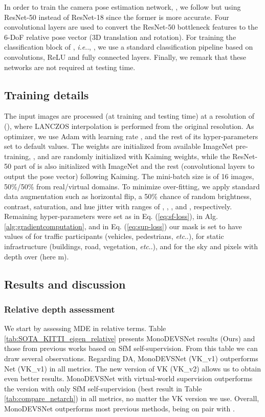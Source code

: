 \documentclass[journal]{IEEEtran}
\makeatletter
\DeclareRobustCommand\onedot{\futurelet\@let@token\@onedot}
\def\@onedot{\ifx\@let@token.\else.\null\fi\xspace}
\def\ie{\emph{i.e}\onedot} \def\Ie{\emph{I.e}\onedot}
\def\etc{\emph{etc}\onedot} \def\vs{\emph{vs}\onedot}
\newcommand{\Eq}[1]{Eq. (\ref{eq:#1})}
\newcommand{\Tab}[1]{Table \ref{tab:#1}}
\newcommand{\Alg}[1]{Alg. \ref{alg:#1}}
\makeatother
\begin{document}
In order to train the camera pose estimation network, , we follow \cite{Godard:2019MonoDepth2} but
using ResNet-50 instead of ResNet-18 since the former is more accurate. Four convolutional layers are used to convert the ResNet-50 bottleneck features to the 6-DoF relative pose vector (3D translation and rotation). For training the classification block of , {\ie}, , we use a standard classification pipeline based on convolutions, ReLU and fully connected layers. Finally, we remark that these networks are not required at testing time.

\subsection{Training details}
\label{ssec:training}

The input images are processed (at training and testing time) at a resolution of  ({}), where LANCZOS interpolation is performed from the  original resolution. As optimizer, we use Adam \cite{Kingma:2015} with learning rate , and the rest of its hyper-parameters set to default values. The weights  are initialized from available ImageNet \cite{Deng:2009} pre-training, , and  are randomly initialized with Kaiming weights, while the ResNet-50 part of  is also initialized with ImageNet and the rest (convolutional layers to output the pose vector) following Kaiming. The mini-batch size is of 16 images, 50\%/50\% from real/virtual domains. To minimize over-fitting, we apply standard data augmentation such as horizontal flip, a 50\% chance of random brightness, contrast, saturation, and hue jitter with ranges of , , , and , respectively. Remaining hyper-parameters were set as  in \Eq{sf-loss},  in \Alg{gradientcomputation}, and in \Eq{sup-loss} our mask  is set to have values of  for traffic participants (vehicles, pedestrians, {\etc}),  for static infrastructure (buildings, road, vegetation, {\etc}), and  for the sky and pixels with depth over  (here m).

\subsection{Results and discussion}
\label{ssec:results}

\subsubsection{Relative depth assessment}
We start by assessing MDE in relative terms. Table \ref{tab:SOTA_KITTI_eigen_relative} presents MonoDEVSNet results (Ours) and those from previous works based on SfM self-supervision. From this table we can draw several observations. Regarding DA, MonoDEVSNet (VK\_v1) outperforms Net (VK\_v1) in all metrics. The new version of VK (VK\_v2) allows us to obtain even better results. MonoDEVSNet with virtual-world supervision outperforms the version with only SfM self-supervision (best result in \Tab{compare_netarch}) in all metrics, no matter the VK version we use. Overall, MonoDEVSNet outperforms most previous methods, being on pair with  \cite{Guizilini:2020semantic}.
\end{document}
